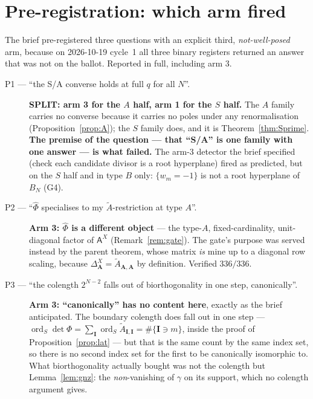 \documentclass[11pt]{article}
\theoremstyle{definition}
\newcommand{\At}{\widetilde{A}}
\newcommand{\bI}{\mathbf{I}}
\newcommand{\bA}{\mathbf{A}}
\newcommand{\ord}{\operatorname{ord}}
\begin{document}
\section{Pre-registration: which arm fired}
\label{sec:prereg}

The brief pre-registered three questions with an explicit third,
\emph{not-well-posed} arm, because on 2026-10-19 cycle~1 all three binary
registers returned an answer that was not on the ballot.  Reported in full,
including arm 3.

\begin{description}
\item[P1 --- ``the S/A converse holds at full $q$ for all $N$''.]
  \textbf{SPLIT: arm 3 for the $A$ half, arm 1 for the $S$ half.}  The $A$ family
  carries no converse because it carries no poles under any renormalisation
  (Proposition~\ref{prop:A}); the $S$ family does, and it is
  Theorem~\ref{thm:Sprime}.  \textbf{The premise of the question --- that ``S/A''
  is one family with one answer --- is what failed.}  The arm-3 detector the
  brief specified (check each candidate divisor is a root hyperplane) fired as
  predicted, but on the $S$ half and in type $B$ only: $\{w_m=-1\}$ is not a root
  hyperplane of $B_N$ (G4).
\item[P2 --- ``$\widehat\Phi$ specialises to my $\At$-restriction at type $A$''.]
  \textbf{Arm 3: $\widehat\Phi$ is a different object} --- the type-$A$,
  fixed-cardinality, unit-diagonal factor of $\mathsf A^{X}$
  (Remark~\ref{rem:gate}).  The gate's purpose was served instead by the parent
  theorem, whose matrix \emph{is} mine up to a diagonal row scaling, because
  $\Delta^{X}_{\bA}=\At_{\bA,\bA}$ by definition.  Verified $336/336$.
\item[P3 --- ``the colength $2^{N-2}$ falls out of biorthogonality in one step,
  canonically''.]  \textbf{Arm 3: ``canonically'' has no content here}, exactly as
  the brief anticipated.  The boundary colength does fall out in one step ---
  $\ord_S\det\Phi=\sum_{\bI}\ord_S\At_{\bI,\bI}=\#\{\bI\ni m\}$, inside the proof
  of Proposition~\ref{prop:lat} --- but that is the same count by the same index
  set, so there is no second index set for the first to be canonically isomorphic
  to.  What biorthogonality actually bought was not the colength but
  Lemma~\ref{lem:gnz}: the \emph{non}-vanishing of $\gamma$ on its support, which
  no colength argument gives.
\end{description}
\end{document}
